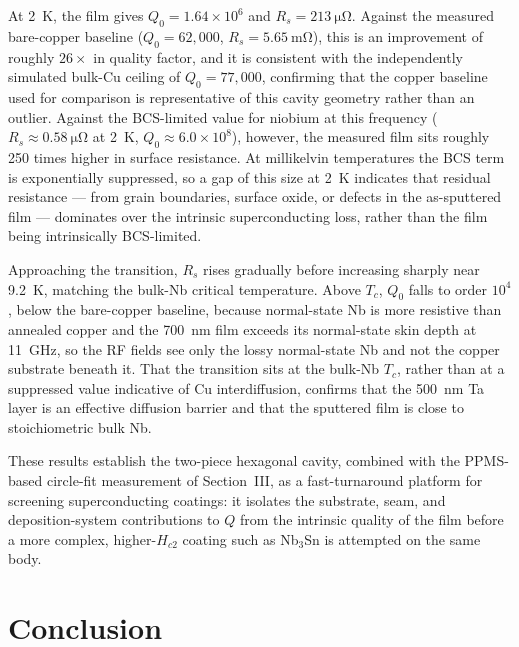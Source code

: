 \documentclass[10pt,journal]{IEEEtran}
\begin{document}
At \SI{2}{\kelvin}, the film gives $Q_0=1.64\times10^{6}$ and $R_s=\SI{213}{\micro\ohm}$. Against the measured bare-copper baseline ($Q_0=62{,}000$, $R_s=\SI{5.65}{\milli\ohm}$), this is an improvement of roughly $26\times$ in quality factor, and it is consistent with the independently simulated bulk-Cu ceiling of $Q_0=77{,}000$, confirming that the copper baseline used for comparison is representative of this cavity geometry rather than an outlier. Against the BCS-limited value for niobium at this frequency ($R_s \approx \SI{0.58}{\micro\ohm}$ at \SI{2}{\kelvin}, $Q_0\approx 6.0\times10^{8}$), however, the measured film sits roughly 250 times higher in surface resistance. At millikelvin temperatures the BCS term is exponentially suppressed, so a gap of this size at \SI{2}{\kelvin} indicates that residual resistance --- from grain boundaries, surface oxide, or defects in the as-sputtered film --- dominates over the intrinsic superconducting loss, rather than the film being intrinsically BCS-limited.

Approaching the transition, $R_s$ rises gradually before increasing sharply near \SI{9.2}{\kelvin}, matching the bulk-Nb critical temperature. Above $T_c$, $Q_0$ falls to order $10^{4}$, below the bare-copper baseline, because normal-state Nb is more resistive than annealed copper and the \SI{700}{\nano\meter} film exceeds its normal-state skin depth at \SI{11}{\giga\hertz}, so the RF fields see only the lossy normal-state Nb and not the copper substrate beneath it. That the transition sits at the bulk-Nb $T_c$, rather than at a suppressed value indicative of Cu interdiffusion, confirms that the \SI{500}{\nano\meter} Ta layer is an effective diffusion barrier and that the sputtered film is close to stoichiometric bulk Nb.

These results establish the two-piece hexagonal cavity, combined with the PPMS-based circle-fit measurement of Section~III, as a fast-turnaround platform for screening superconducting coatings: it isolates the substrate, seam, and deposition-system contributions to $Q$ from the intrinsic quality of the film before a more complex, higher-$H_{c2}$ coating such as Nb$_3$Sn is attempted on the same body.

\section{Conclusion}
\end{document}
